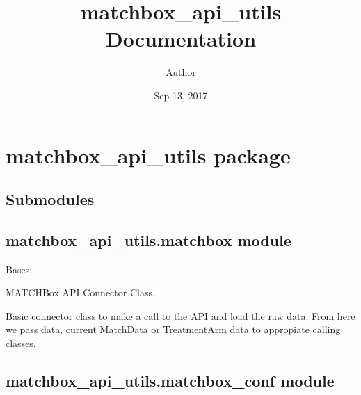 \documentclass[letterpaper,10pt,english]{sphinxmanual}
\title{matchbox\_api\_utils Documentation}
\date{Sep 13, 2017}
\author{Author}
\begin{document}
\maketitle
\sphinxtableofcontents
{}\label{\detokenize{index::doc}}



\chapter{matchbox\_api\_utils package}
\label{\detokenize{matchbox_api_utils:matchbox-api-utils-package}}\label{\detokenize{matchbox_api_utils:welcome-to-matchbox-api-utils-s-documentation}}\label{\detokenize{matchbox_api_utils::doc}}

\section{Submodules}
\label{\detokenize{matchbox_api_utils:submodules}}

\section{matchbox\_api\_utils.matchbox module}
\label{\detokenize{matchbox_api_utils:module-matchbox_api_utils.matchbox}}\label{\detokenize{matchbox_api_utils:matchbox-api-utils-matchbox-module}}

\begin{fulllineitems}
\label{\detokenize{matchbox_api_utils:matchbox_api_utils.matchbox.Matchbox}}
Bases: 

MATCHBox API Connector Class.

Basic connector class to make a call to the API and load the raw data. From
here we pass data, current MatchData or TreatmentArm data to appropiate calling
classes.

\end{fulllineitems}



\section{matchbox\_api\_utils.matchbox\_conf module}
\label{\detokenize{matchbox_api_utils:module-matchbox_api_utils.matchbox_conf}}\label{\detokenize{matchbox_api_utils:matchbox-api-utils-matchbox-conf-module}}
\end{document}
